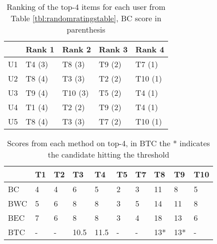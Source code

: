 \begin{table}[H]
	\centering
	\begin{tabular}{|l|l|l|l|l|}
		\hline
		& Rank 1 & Rank 2  & Rank 3 & Rank 4  \\ \hline
		U1 & T4 (3) & T8 (3)  & T9 (2) & T7 (1)  \\ \hline
		U2 & T8 (4) & T3 (3)  & T2 (2) & T10 (1) \\ \hline
		U3 & T9 (4) & T10 (3) & T5 (2) & T4 (1)  \\ \hline
		U4 & T1 (4) & T2 (2)  & T9 (2) & T4 (1)  \\ \hline
		U5 & T8 (4) & T3 (3)  & T7 (2) & T10 (1) \\ \hline
	\end{tabular}
	\caption{Ranking of the top-4 items for each user from Table \ref{tbl:randomratingstable}, BC score in parenthesis}
	\label{tbl:top4borda}
\end{table}

\begin{table}[H]
	\centering
	\begin{tabular}{|l|l|l|l|l|l|l|l|l|l|}
		\hline
		& T1 & T2 & T3   & T4   & T5 & T7 & T8  & T9  & T10 \\ \hline
		BC	 & 4  & 4  & 6    & 5    & 2  & 3  & 11  & 8   & 5   \\ \hline
		BWC   & 5  & 6  & 8    & 8    & 3  & 5  & 14  & 11  & 8   \\ \hline
		BEC   & 7  & 6  & 8    & 8    & 3  & 4  & 18  & 13  & 6   \\ \hline
		BTC   & -  & -  & 10.5 & 11.5 & -  & -  & 13* & 13* & -   \\ \hline
	\end{tabular}
	\caption{Scores from each method on top-4, in BTC the * indicates the candidate hitting the threshold}
	\label{tbl:novelscoresexample}
\end{table}